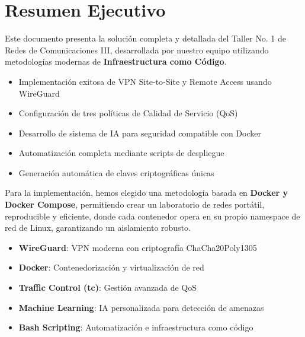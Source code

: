 \section{Resumen Ejecutivo}

Este documento presenta la solución completa y detallada del Taller No. 1 de Redes de Comunicaciones III, desarrollada por nuestro equipo utilizando metodologías modernas de \textbf{Infraestructura como Código}.

\begin{exito}
\begin{itemize}
    \item Implementación exitosa de VPN Site-to-Site y Remote Access usando WireGuard
    \item Configuración de tres políticas de Calidad de Servicio (QoS)
    \item Desarrollo de sistema de IA para seguridad compatible con Docker
    \item Automatización completa mediante scripts de despliegue
    \item Generación automática de claves criptográficas únicas
\end{itemize}
\end{exito}

Para la implementación, hemos elegido una metodología basada en \textbf{Docker y Docker Compose}, permitiendo crear un laboratorio de redes portátil, reproducible y eficiente, donde cada contenedor opera en su propio namespace de red de Linux, garantizando un aislamiento robusto.

\begin{destacado}
\begin{itemize}
    \item \textbf{WireGuard}: VPN moderna con criptografía ChaCha20Poly1305
    \item \textbf{Docker}: Contenedorización y virtualización de red
    \item \textbf{Traffic Control (tc)}: Gestión avanzada de QoS
    \item \textbf{Machine Learning}: IA personalizada para detección de amenazas
    \item \textbf{Bash Scripting}: Automatización e infraestructura como código
\end{itemize}
\end{destacado}
